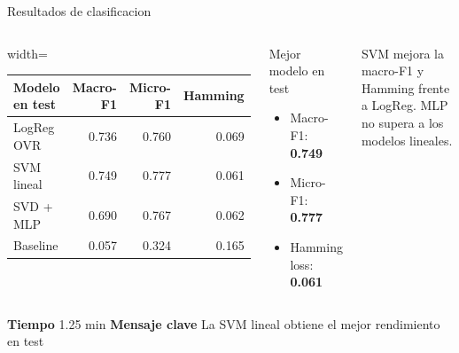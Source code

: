 \documentclass[aspectratio=169,10pt]{beamer}
\newcommand{\slidemeta}[2]{
  \vfill
  {\scriptsize\color{Muted}\textbf{Tiempo} #1 \hfill \textbf{Mensaje clave} #2}
}
\begin{document}
\begin{frame}{Resultados de clasificacion}
  \begin{columns}[T,onlytextwidth]
    \begin{adjustbox}{width=\linewidth}
      \begin{tabular}{lrrr}
        \toprule
        \textbf{Modelo en test} & \textbf{Macro-F1} & \textbf{Micro-F1} & \textbf{Hamming}\\
        \midrule
        LogReg OVR & 0.736 & 0.760 & 0.069\\
        \rowcolor{Mint}
        SVM lineal & 0.749 & 0.777 & 0.061\\
        SVD + MLP & 0.690 & 0.767 & 0.062\\
        Baseline & 0.057 & 0.324 & 0.165\\
        \bottomrule
      \end{tabular}
    \end{adjustbox}
    \begin{block}{Mejor modelo en test}
      \begin{itemize}
        \item Macro-F1: \textbf{0.749}
        \item Micro-F1: \textbf{0.777}
        \item Hamming loss: \textbf{0.061}
      \end{itemize}
    \end{block}
    \small SVM mejora la macro-F1 y Hamming frente a LogReg. MLP no supera a los modelos lineales.
  \end{columns}
  \slidemeta{1.25 min}{La SVM lineal obtiene el mejor rendimiento en test}
\end{frame}
\end{document}
